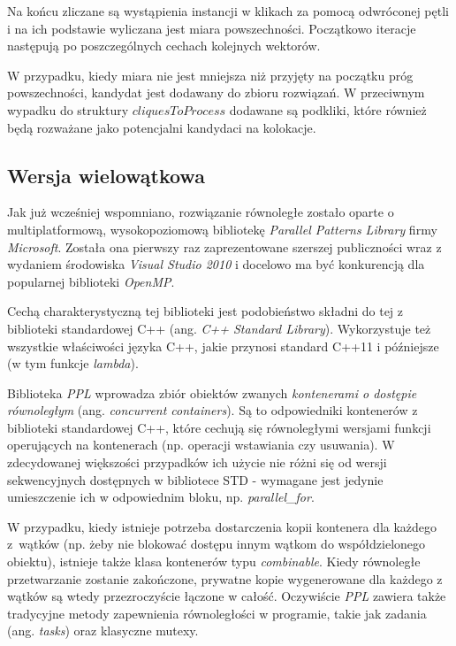 \documentclass[12pt]{article}
\begin{document}
Na końcu zliczane są wystąpienia instancji w klikach za pomocą odwróconej pętli i na ich podstawie wyliczana jest miara powszechności. Początkowo iteracje następują po poszczególnych cechach kolejnych wektorów.

W przypadku, kiedy miara nie jest mniejsza niż przyjęty na początku próg powszechności, kandydat jest dodawany do zbioru rozwiązań. W przeciwnym wypadku do struktury $ cliquesToProcess $ dodawane są podkliki, które również będą rozważane jako potencjalni kandydaci na kolokacje.

\subsection{Wersja wielowątkowa}

Jak już wcześniej wspomniano, rozwiązanie równoległe zostało oparte o multiplatformową, wysokopoziomową bibliotekę \textit{Parallel Patterns Library} firmy \textit{Microsoft}. Została ona pierwszy raz zaprezentowane szerszej publiczności wraz z wydaniem środowiska \textit{Visual Studio 2010} i docelowo ma być konkurencją dla popularnej biblioteki \textit{OpenMP}. 

Cechą charakterystyczną tej biblioteki jest podobieństwo składni do tej z biblioteki standardowej C++ (ang. \textit{C++ Standard Library}). Wykorzystuje też wszystkie właściwości języka C++, jakie przynosi standard C++11 i późniejsze (w tym funkcje \textit{lambda}).

Biblioteka \textit{PPL} wprowadza zbiór obiektów zwanych \textit{kontenerami o dostępie równoległym} (ang. \textit{concurrent containers}). Są to odpowiedniki kontenerów z biblioteki standardowej C++, które cechują się równoległymi wersjami funkcji operujących na kontenerach (np. operacji wstawiania czy usuwania). W zdecydowanej większości przypadków ich użycie nie różni się od wersji sekwencyjnych dostępnych w bibliotece STD - wymagane jest jedynie umieszczenie ich w odpowiednim bloku, np. \textit{parallel\_for}. 

W przypadku, kiedy istnieje potrzeba dostarczenia kopii kontenera dla każdego z~wątków (np. żeby nie blokować dostępu innym wątkom do współdzielonego obiektu), istnieje także klasa kontenerów typu \textit{combinable}. Kiedy równoległe przetwarzanie zostanie zakończone, prywatne kopie wygenerowane dla każdego z wątków są wtedy przezroczyście łączone w całość. Oczywiście \textit{PPL} zawiera także tradycyjne metody zapewnienia równoległości w programie, takie jak zadania (ang. \textit{tasks}) oraz klasyczne mutexy.
\end{document}
